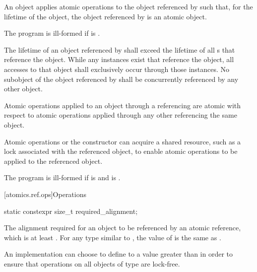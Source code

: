 \pnum
An  object applies atomic operations to
the object referenced by  such that,
for the lifetime of the  object,
the object referenced by  is an atomic object.

\pnum
The program is ill-formed if  is .

\pnum
The lifetime of an object referenced by 
shall exceed the lifetime of all s that reference the object.
While any  instances exist
that reference the  object,
all accesses to that object shall exclusively occur
through those  instances.
No subobject of the object referenced by 
shall be concurrently referenced by any other  object.

\pnum
Atomic operations applied to an object
through a referencing  are atomic with respect to
atomic operations applied through any other 
referencing the same object.
\begin{note}
Atomic operations or the  constructor can acquire
a shared resource, such as a lock associated with the referenced object,
to enable atomic operations to be applied to the referenced object.
\end{note}

\pnum
The program is ill-formed
if  is  and
 is .

[atomics.ref.ops]{Operations}

%
%
%
%
\begin{itemdecl}
static constexpr size_t required_alignment;
\end{itemdecl}

\begin{itemdescr}
\pnum
The alignment required for an object to be referenced by an atomic reference,
which is at least .
For any type  similar to ,
the value of 
is the same as .

\pnum
\begin{note}
An implementation can choose to define
to a value greater than  in order to ensure that
operations on all objects of type  are lock-free.
\end{note}
\end{itemdescr}

